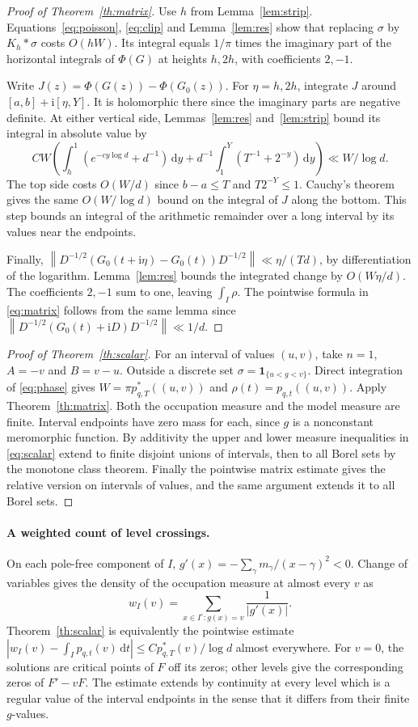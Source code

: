 \documentclass[11pt]{article}
\newcommand{\dd}{\,\mathrm d}\newcommand{\ii}{\mathrm i}
\newcommand{\id}{\mathbf1}\newcommand{\norm}[1]{\left\lVert#1\right\rVert}
\newcommand{\ph}{\Phi}\newcommand{\Gm}{G_0}
\begin{document}
\begin{proof}[Proof of Theorem~\ref{th:matrix}]
Use $h$ from Lemma~\ref{lem:strip}. Equations~\eqref{eq:poisson}, \eqref{eq:clip} and Lemma~\ref{lem:res} show that replacing $\sigma$ by $K_h*\sigma$ costs $O(hW)$. Its integral equals $1/\pi$ times the imaginary part of the horizontal integrals of $\ph(G)$ at heights $h,2h$, with coefficients $2,-1$.

Write $J(z)=\ph(G(z))-\ph(\Gm(z))$. For $\eta=h,2h$, integrate $J$ around $[a,b]+\ii[\eta,Y]$. It is holomorphic there since the imaginary parts are negative definite. At either vertical side, Lemmas~\ref{lem:res} and~\ref{lem:strip} bound its integral in absolute value by
\[
 CW\left(\int_h^1(e^{-cy\log d}+d^{-1})\dd y+
    d^{-1}\int_1^Y(T^{-1}+2^{-y})\dd y\right)\ll W/\log d.
\]
The top side costs $O(W/d)$ since $b-a\le T$ and $T2^{-Y}\le1$. Cauchy's theorem gives the same $O(W/\log d)$ bound on the integral of $J$ along the bottom. This step bounds an integral of the arithmetic remainder over a long interval by its values near the endpoints.

Finally, $\norm{D^{-1/2}(\Gm(t+\ii\eta)-\Gm(t))D^{-1/2}}\ll\eta/(Td)$, by differentiation of the logarithm. Lemma~\ref{lem:res} bounds the integrated change by $O(W\eta/d)$. The coefficients $2,-1$ sum to one, leaving $\int_I\rho$. The pointwise formula in \eqref{eq:matrix} follows from the same lemma since $\norm{D^{-1/2}(\Gm(t)+\ii D)D^{-1/2}}\ll1/d$.
\end{proof}

\begin{proof}[Proof of Theorem~\ref{th:scalar}]
For an interval of values $(u,v)$, take $n=1$, $A=-v$ and $B=v-u$. Outside a discrete set $\sigma=\id_{\{u<g<v\}}$. Direct integration of \eqref{eq:phase} gives
$W=\pi p^*_{q,T}((u,v))$ and $\rho(t)=p_{q,t}((u,v))$. Apply Theorem~\ref{th:matrix}. Both the occupation measure and the model measure are finite. Interval endpoints have zero mass for each, since $g$ is a nonconstant meromorphic function. By additivity the upper and lower measure inequalities in \eqref{eq:scalar} extend to finite disjoint unions of intervals, then to all Borel sets by the monotone class theorem. Finally the pointwise matrix estimate gives the relative version on intervals of values, and the same argument extends it to all Borel sets.
\end{proof}

\paragraph{A weighted count of level crossings.}
On each pole-free component of $I$, $g'(x)=-\sum_\gamma m_\gamma/(x-\gamma)^2<0$. Change of variables gives the density of the occupation measure at almost every $v$ as
\[
 w_I(v)=\sum_{x\in I^{\circ}:g(x)=v}\frac1{|g'(x)|}.
\]
Theorem~\ref{th:scalar} is equivalently the pointwise estimate
$|w_I(v)-\int_I p_{q,t}(v)\dd t|\le C p^*_{q,T}(v)/\log d$ almost everywhere. For $v=0$, the solutions are critical points of $F$ off its zeros; other levels give the corresponding zeros of $F'-vF$. The estimate extends by continuity at every level which is a regular value of the interval endpoints in the sense that it differs from their finite $g$-values.
\end{document}
